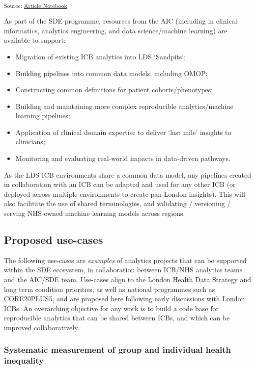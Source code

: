 \documentclass[
  letterpaper,
  DIV=11,
  numbers=noendperiod]{scrartcl}
\providecommand{\tightlist}{%
  \setlength{\itemsep}{0pt}\setlength{\parskip}{0pt}}\usepackage{longtable,booktabs,array}
\begin{document}
\textsubscript{Source:
\href{https://d3london.github.io/sde_aic_phase0/index.qmd.html}{Article
Notebook}}

As part of the SDE programme, resources from the AIC (including in
clinical informatics, analytics engineering, and data science/machine
learning) are available to support:

\begin{itemize}
\tightlist
\item
  Migration of existing ICB analytics into LDS `Sandpits';
\item
  Building pipelines into common data models, including OMOP;
\item
  Constructing common definitions for patient cohorts/phenotypes;
\item
  Building and maintaining more complex reproducible analytics/machine
  learning pipelines;
\item
  Application of clinical domain expertise to deliver `last mile'
  insights to clinicians;
\item
  Monitoring and evaluating real-world impacts in data-driven pathways.
\end{itemize}

As the LDS ICB environments share a common data model, any pipelines
created in collaboration with an ICB can be adapted and used for any
other ICB (or deployed across multiple environments to create pan-London
insights). This will also facilitate the use of shared terminologies,
and validating / versioning / serving NHS-owned machine learning models
across regions.

\subsection{Proposed use-cases}\label{proposed-use-cases}

The following use-cases are \emph{examples} of analytics projects that
can be supported within the SDE ecosystem, in collaboration between
ICB/NHS analytics teams and the AIC/SDE team. Use-cases align to the
London Health Data Strategy and long term condition priorities, as well
as national programmes such as CORE20PLUS5, and are proposed here
following early discussions with London ICBs. An overarching objective
for any work is to build a code base for reproducible analytics that can
be shared between ICBs, and which can be improved collaboratively.

\subsubsection{Systematic measurement of group and individual health
inequality}\label{systematic-measurement-of-group-and-individual-health-inequality}
\end{document}
